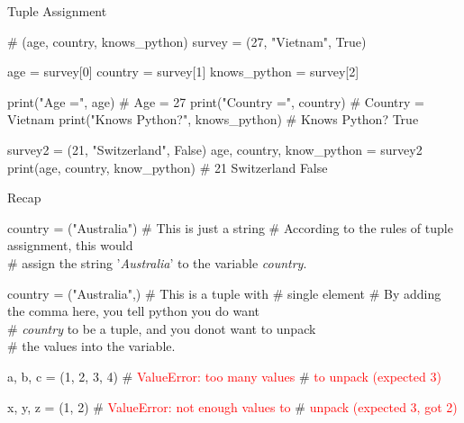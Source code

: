 \documentclass{beamer}
\begin{document}
\begin{frame}[fragile]{Tuple Assignment}
\begin{pythoncode}
# (age, country, knows\_python)
survey = (27, "Vietnam", True)

age = survey[0]
country = survey[1]
knows_python = survey[2]

print("Age =", age)   # Age = 27
print("Country =", country)   # Country = Vietnam
print("Knows Python?", knows_python)  # Knows Python? True

survey2 = (21, "Switzerland", False)
age, country, know_python = survey2
print(age, country, know_python)  # 21 Switzerland False
\end{pythoncode}
\end{frame}

\begin{frame}[fragile]{Recap}
\begin{pythoncode}
country = ("Australia")   # This is just a string
# According to the rules of tuple assignment, this would\\
# assign the string '\textit{Australia}' to the variable \textit{country}.

country = ("Australia",)  # This is a tuple with 
                          # single element
# By adding the comma here, you tell python you do want\\
# \textit{country} to be a tuple, and you donot want to unpack\\
# the values into the variable.

a, b, c = (1, 2, 3, 4)    # \textcolor{red}{ValueError: too many values}
                          # \textcolor{red}{to unpack (expected 3)}

x, y, z = (1, 2)  # \textcolor{red}{ValueError: not enough values to}
                  # \textcolor{red}{unpack (expected 3, got 2)}
\end{pythoncode}
\end{frame}
\end{document}
